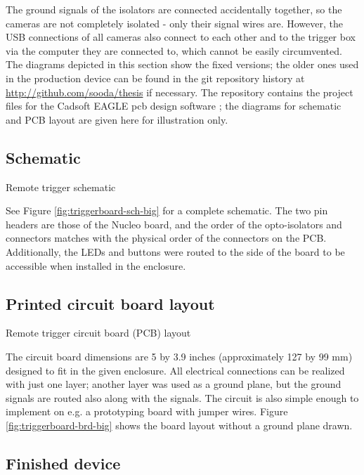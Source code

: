 The ground signals of the isolators are connected accidentally together, so the cameras are not completely isolated - only their signal wires are.
However, the USB connections of all cameras also connect to each other and to the trigger box via the computer they are connected to, which cannot be easily circumvented.
The diagrams depicted in this section show the fixed versions; the older ones used in the production device can be found in the git repository history at \url {http://github.com/sooda/thesis} if necessary.
The repository contains the project files for the Cadsoft EAGLE pcb design software \cite{eaglepcb}; the diagrams for schematic and PCB layout are given here for illustration only.

\subsection{Schematic} \label{app:fullschematic}

{Remote trigger schematic}

See Figure \ref{fig:triggerboard-sch-big} for a complete schematic.
The two pin headers are those of the Nucleo board, and the order of the opto-isolators and connectors matches with the physical order of the connectors on the PCB.
Additionally, the LEDs and buttons were routed to the side of the board to be accessible when installed in the enclosure.

\subsection{Printed circuit board layout}

{Remote trigger circuit board (PCB) layout}

The circuit board dimensions are 5 by 3.9 inches (approximately 127 by 99 mm) designed to fit in the given enclosure.
All electrical connections can be realized with just one layer;
another layer was used as a ground plane, but the ground signals are routed also along with the signals.
The circuit is also simple enough to implement on e.g. a prototyping board with jumper wires.
Figure \ref{fig:triggerboard-brd-big} shows the board layout without a ground plane drawn.

\subsection{Finished device}


